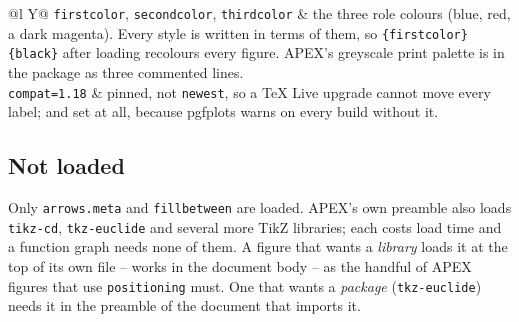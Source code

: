 \begin{center}
\begin{tabularx}{\linewidth}{@{}l Y@{}}
\texttt{firstcolor}, \texttt{secondcolor}, \texttt{thirdcolor} & the three
  role colours (blue, red, a dark magenta). Every style is written in
  terms of them, so \texttt{\{firstcolor\}\{black\}} after
  loading recolours every figure. APEX's greyscale print palette is in the
  package as three commented lines.\\
\texttt{compat=1.18} & pinned, not \texttt{newest}, so a \TeX{} Live
  upgrade cannot move every label; and set at all, because pgfplots warns
  on every build without it.\\
\end{tabularx}
\end{center}

\subsection*{Not loaded}

Only \texttt{arrows.meta} and \texttt{fillbetween} are loaded. APEX's own
preamble also loads \texttt{tikz-cd}, \texttt{tkz-euclide} and several
more TikZ libraries; each costs load time and a function graph needs none
of them. A figure that wants a \emph{library} loads it at the top of its
own file --  works in the document body -- as the
handful of APEX figures that use \texttt{positioning} must. One that wants
a \emph{package} (\texttt{tkz-euclide}) needs it in the preamble of the
document that imports it.
